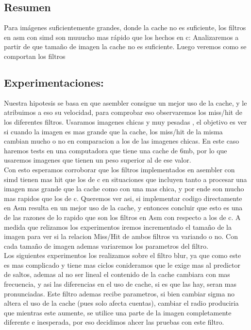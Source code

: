 \subsection{Resumen}

Para imágenes suficientemente grandes, donde la cache no es suficiente, los filtros en asm con simd son muuucho mas rápido que los hechos en c: Analizaremos a partir de que tamaño de imagen la cache no es suficiente. Luego veremos como se comportan los filtros


\subsection{Experimentaciones:}

Nuestra hipotesis se basa en que asembler consigue un mejor uso de la cache, y le atribuimos a eso su velocidad, para comprobar eso observaremos los miss/hit de los diferentes filtros. Usaramos imagenes chicas y muy pesadas , el objetivo es ver si cuando la imagen es mas grande que la cache, los miss/hit de la misma cambian mucho o no en comparacion a los de las imagenes chicas. En este caso haremos tests en una computadora que tiene una cache de 6mb, por lo que usaremos imagenes que tienen un peso superior al de ese valor. \\


Con esto esperamos corroborar que los filtros implementados en asembler con simd tienen mas hit que los de c en situaciones que incluyen tanto a procesar una imagen mas grande que la cache como con una mas chica, y por ende son mucho mas rapidos que los de c. Queremos ver asi, si implementar codigo directamente en Asm resulta en un mejor uso de la cache, y entonces concluir que esto es una de las razones de lo rapido que son los filtros en Asm con respecto a los de c. A medida que relizamos los experimentos iremos incrementado el tamaño de la imagen para ver si la relacion Miss/Hit de ambos filtros va variando o no. Con cada tamaño de imagen ademas variaremos los parametros del filtro. \\


Los siguientes experimentos los realizamos sobre el filtro blur, ya que como este es mas complicado y tiene mas ciclos conideramos que le exige mas al predictor de saltos, ademas al no ser lineal el contenido de la cache cambiara con mas frecuencia, y asi las diferencias en el uso de cache, si es que las hay, seran mas pronunciadas. Este filtro ademas recibe parametros, si bien cambiar sigma no altera el uso de la cache (pues solo afecta cuentas), cambiar el radio produciria que mientras este aumente, se utilice una parte de la imagen completamente diferente e inesperada, por eso decidimos ahcer las pruebas con este filtro. \\


